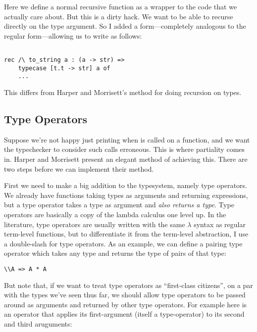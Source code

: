 \message{ !name(report.tex)}\documentclass[pageno]{jpaper}
\begin{document}
{{{Here we define a normal recursive function as a wrapper to the code that we actually care about.
But this is a dirty hack.  We want to be able to recurse directly on the type argument. So I added a 
form---completely analogous to the regular  form---allowing us to write  as follows:

\begin{lstlisting}[mathescape]

rec /\ to_string a : (a -> str) =>
    typecase [t.t -> str] a of
    ...

\end{lstlisting}

This differs from Harper and Morrisett's method for doing recursion on types.

\subsection{Type Operators}

Suppose we're not happy just printing  when  is called on a function,
and we want the typechecker to consider such calls erroneous.  This is where partiality comes in.
Harper and Morrisett present an elegant method of achieving this. There are two steps before
we can implement their method.

First we need to make a big addition to the typesystem, namely type operators.
We already have functions taking types as arguments and returning expressions, but a type operator takes
a type as argument and \textit{also returns a type}.
Type operators are basically a copy of the lambda calculus one level up.  In the literature, type operators are usually written with the same $\lambda$ syntax as regular term-level functions, but to differentiate it from
the term-level abstraction, I use a double-slash \lsti{\\} for type operators. As an example, we can define
a pairing type operator which takes any type and returns the type of pairs of that type:

\begin{lstlisting}
\\A => A * A
\end{lstlisting}

But note that, if we want to treat type operators as ``first-class citizens'', on a par with the types
we've seen thus far, we should allow type operators to be passed around as arguments and returned by other
type operators. For example here is an operator that applies its first-argument (itself a type-operator)
to its second and third aruguments:

}}}
\end{document}
